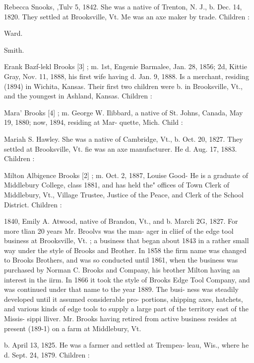 \documentclass[oneside]{book}
\begin{document}
Rebecca Snooks, ,Tulv 5, 1842. She was a native of Trenton, 
N. J., b. Dec. 14, 1820. They settled at Brooksville, Vt. Me 
was an axe maker by trade. Children : 


Ward. 


Smith. 



Erank Bazf-lekl Brooks [3] ; m. 1st, Engenie Barmalee, Jan. 
28, 1856; 2d, Kittie Gray, Nov. 11, 1888, his first wife having 
d. Jan. 9, 1888. Is a merchant, residing (1894) in Wichita, 
Kansas. Their first two children were b. in Brooksville, Vt., 
and the youngest in Ashland, Kansas. Children : 




Mara' Brooks [4] ; m. George W. Ilibbard, a native of St. 
Johns, Canada, May 19, 1880; now, 1894, residing at Mar- 
quette, Mich. Child : 




Mariah S. Hawley. She was a native of Cambridge, Vt., b. 
Oct. 20, 1827. They settled at Brooksville, Vt. fie was an 
axe manufacturer. He d. Aug. 17, 1883. Children : 



Milton Albigence Brooks [2] ; m. Oct. 2, 1887, Louise Good- 
He is a graduate of Middlebury College, class 1881, and has 
held the" offices of Town Clerk of Middlebury, Vt., Village 
Trustee, Justice of the Peace, and Clerk of the School District. 
Children : 








1840, Emily A. Atwood, native of Brandon, Vt., and b. Marcli 
2G, 1827. For more tlian 20 years Mr. Broolvs was the man- 
ager in cliief of the edge tool business at Brooksville, Vt. ; a 
business that began about 1843 in a rather small way under 
the style of Brooks and Brother. In 1858 the firm name was 
changed to Brooks Brothers, and was so conducted until 1861, 
when the business was purchased by Norman C. Brooks and 
Company, his brother Milton having an interest in the iirm. 
In 1866 it took the style of Brooks Edge Tool Company, and 
was continued under that name to the year 1889. The busi- 
ness was steadily developed until it assumed considerable pro- 
portions, shipping axes, hatchets, and various kinds of edge 
tools to supply a large part of the territory east of the Missis- 
sippi lliver. Mr. Brooks having retired from active business 
resides at present (189-1) on a farm at Middlebury, Vt. 


b. April 13, 1825. He was a farmer and settled at Trempea- 
leau, Wis., where he d. Sept. 24, 1879. Children : 
\end{document}
